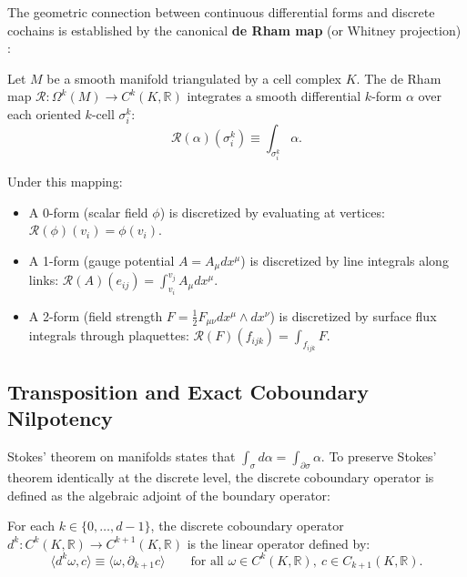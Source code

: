 The geometric connection between continuous differential forms and discrete cochains is established by the canonical \textbf{de Rham map} (or Whitney projection) \cite{Whitney1957,deRham1984}:
\begin{definition}
Let $M$ be a smooth manifold triangulated by a cell complex $K$. The de Rham map $\mathcal{R}: \Omega^k(M) \to C^k(K, \mathbb{R})$ integrates a smooth differential $k$-form $\alpha$ over each oriented $k$-cell $\sigma_i^k$:
\begin{equation}
\label{eq:derham_projection_map}
\mathcal{R}(\alpha)(\sigma_i^k) \equiv \int_{\sigma_i^k} \alpha.
\end{equation}
\end{definition}
Under this mapping:
\begin{itemize}
    \item A 0-form (scalar field $\phi$) is discretized by evaluating at vertices: $\mathcal{R}(\phi)(v_i) = \phi(v_i)$.
    \item A 1-form (gauge potential $A = A_\mu dx^\mu$) is discretized by line integrals along links: $\mathcal{R}(A)(e_{ij}) = \int_{v_i}^{v_j} A_\mu dx^\mu$.
    \item A 2-form (field strength $F = \frac{1}{2} F_{\mu\nu} dx^\mu \wedge dx^\nu$) is discretized by surface flux integrals through plaquettes: $\mathcal{R}(F)(f_{ijk}) = \int_{f_{ijk}} F$.
\end{itemize}

\subsection{Transposition and Exact Coboundary Nilpotency}
\label{subsec:coboundary_nilpotency_sub}

Stokes' theorem on manifolds states that $\int_\sigma d\alpha = \int_{\partial \sigma} \alpha$. To preserve Stokes' theorem identically at the discrete level, the discrete coboundary operator is defined as the algebraic adjoint of the boundary operator:

\begin{definition}
\label{def:coboundary_operator}
For each $k \in \{0, \dots, d-1\}$, the discrete coboundary operator $d^k : C^k(K, \mathbb{R}) \to C^{k+1}(K, \mathbb{R})$ is the linear operator defined by:
\begin{equation}
\label{eq:coboundary_adjoint_def}
\langle d^k \omega, c \rangle \equiv \langle \omega, \partial_{k+1} c \rangle \qquad \text{for all } \omega \in C^k(K, \mathbb{R}), \ c \in C_{k+1}(K, \mathbb{R}).
\end{equation}
\end{definition}

